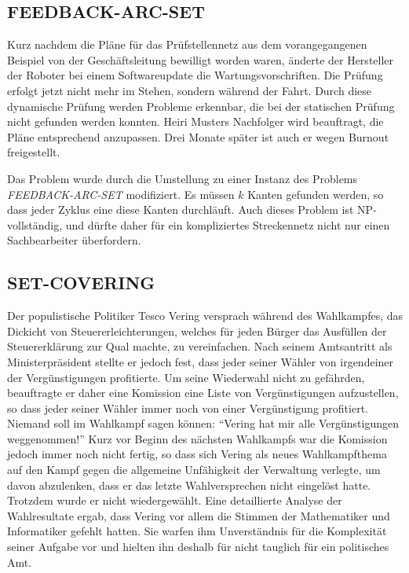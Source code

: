 \subsection{FEEDBACK-ARC-SET}
Kurz nachdem die Pläne für das Prüfstellennetz aus dem vorangegangenen
Beispiel von der Geschäftsleitung bewilligt worden waren, änderte
der Hersteller der Roboter bei einem Softwareupdate die Wartungsvorschriften.
Die Prüfung erfolgt jetzt nicht mehr im Stehen, sondern während der
Fahrt.
Durch diese dynamische Prüfung werden Probleme erkennbar, die bei der
statischen Prüfung nicht gefunden werden konnten.
Heiri Musters
Nachfolger wird beauftragt, die Pläne entsprechend anzupassen.
Drei Monate später ist auch er wegen Burnout freigestellt.

\medskip

Das Problem wurde durch die Umstellung zu einer Instanz des
Problems {\it FEEDBACK-ARC-SET} modifiziert.
Es müssen $k$ Kanten gefunden werden, so dass jeder Zyklus eine
diese Kanten durchläuft.
Auch dieses Problem ist NP-vollständig,
und dürfte daher für ein kompliziertes Streckennetz
nicht nur einen Sachbearbeiter überfordern.

\subsection{SET-COVERING}
Der populistische Politiker Tesco Vering versprach während des
Wahlkampfes, das Dickicht von Steuererleichterungen, welches
für jeden Bürger das Ausfüllen der Steuererklärung zur Qual
machte, zu vereinfachen.
Nach seinem Amtsantritt als Ministerpräsident 
stellte er jedoch fest, dass jeder seiner Wähler von irgendeiner
der Vergünstigungen profitierte.
Um seine Wiederwahl nicht
zu gefährden, beauftragte er daher eine Komission eine Liste
von Vergünstigungen aufzustellen, so dass jeder seiner Wähler
immer noch von einer Vergünstigung profitiert.
Niemand soll im
Wahlkampf sagen können: ``Vering hat mir alle Vergünstigungen weggenommen!''
Kurz vor Beginn des nächsten Wahlkampfs war die Komission jedoch
immer noch nicht fertig, so dass sich Vering als neues Wahlkampfthema
auf den Kampf gegen die allgemeine Unfähigkeit der Verwaltung verlegte,
um davon
abzulenken, dass er das letzte Wahlversprechen nicht eingelöst hatte.
Trotzdem wurde er nicht wiedergewählt.
Eine detaillierte Analyse der
Wahlresultate ergab, dass Vering vor allem die Stimmen der Mathematiker und
Informatiker gefehlt hatten.
Sie warfen ihm Unverständnis für die Komplexität seiner Aufgabe vor und 
hielten ihn deshalb für nicht tauglich für ein politisches Amt.

